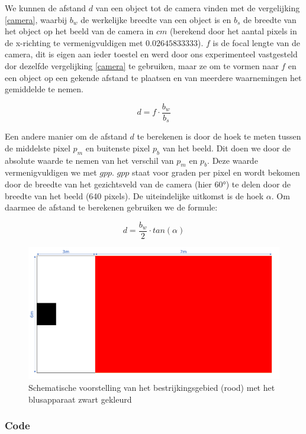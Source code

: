 \documentclass[kulak]{kulakarticle} %
\begin{document}
			We kunnen de afstand \(d\) van een object tot de camera vinden met de vergelijking \ref{camera}, waarbij \(b_w\) de werkelijke breedte van een object is en \(b_s\) de breedte van het object op het beeld van de camera in \(cm\) (berekend door het aantal pixels in de x-richting te vermenigvuldigen met \(0.02645833333\)). \(f\) is de focal lengte van de camera, dit is eigen aan ieder toestel en werd door ons experimenteel vastgesteld dor dezelfde vergelijking \ref{camera} te gebruiken, maar ze om te vormen naar \(f\) en een object op een gekende afstand te plaatsen en van meerdere waarnemingen het gemiddelde te nemen.
			 
				\begin{equation} \label{camera}
					d = f \cdot \frac{b_w}{b_s}
				\end{equation}

			Een andere manier om de afstand \(d\) te berekenen is door de hoek te meten tussen de middelste pixel \(p_m\) en buitenste pixel \(p_b\) van het beeld. Dit doen we door de absolute waarde te nemen van het verschil van \(p_m\) en \(p_b\). Deze waarde vermenigvuldigen we met \(gpp\). \(gpp\) staat voor graden per pixel en wordt bekomen door de breedte van het gezichtsveld van de camera (hier 60°) te delen door de breedte van het beeld (640 pixels). De uiteindelijke uitkomst is de hoek \(\alpha\). Om daarmee de afstand te berekenen gebruiken we de formule:
			
				\begin{equation} \label{camera_2}
					d = \frac{b_w}{2} \cdot tan(\alpha)
				\end{equation}
				
				\begin{figure} [h!]
					\centering                
					\includegraphics[width = .5 \textwidth]{schematische voorstelling bestrijkingsgebied LATEX}
					\caption{Schematische voorstelling van het bestrijkingsgebied (rood) met het blusapparaat zwart gekleurd}
					\label{bestrijkingsgebied}
				\end{figure}


		\subsubsection{Code}
		
\end{document}
